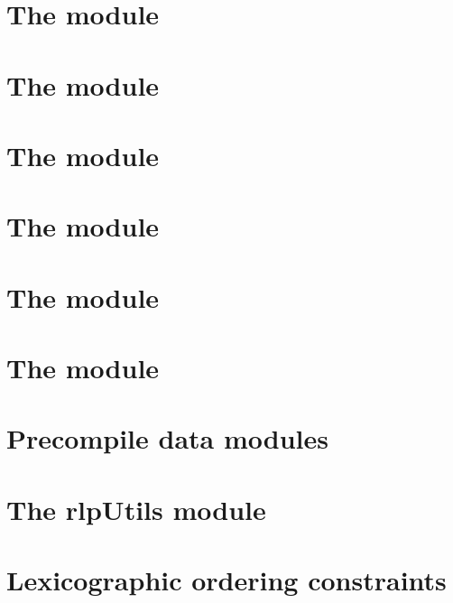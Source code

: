 \documentclass[fleqn]{report}
\begin{document}
\chapter{The \rlpTxnMod{} module}                    \label{chap: txn rlp}         \minitoc    
\chapter{The \txnDataMod{} module}                   \label{chap: txn data}        \minitoc    
\chapter{The \rlpAddrMod{} module}                   \label{chap: addr rlp}        \minitoc    
\chapter{The \rlpTxnRcptMod{} module}                \label{chap: log rlp}         \minitoc    
\chapter{The \logInfoMod{} module}                   \label{chap: log info}        \minitoc    
\chapter{The \logDataMod{} module}                   \label{chap: log data}        \minitoc    
\chapter{Precompile data modules}                    \label{chap: precompile data} \minitoc    
\chapter{The rlpUtils module}                  \label{chap: utils rlp}       \minitoc    


\appendix
\chapter{Lexicographic ordering constraints}         \label{chap: lex}             \minitoc    
\end{document}
